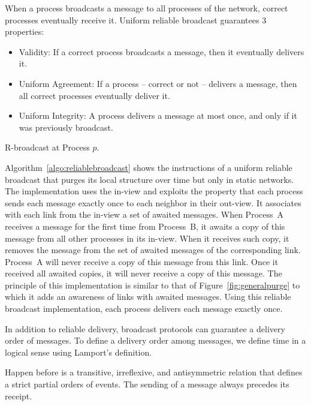 \begin{definition} 
  When a process broadcasts a message to all processes of the network, correct
  processes eventually receive it. Uniform reliable broadcast guarantees 3
  properties:
  \begin{itemize}
  \item Validity: If a correct process broadcasts a message, then it
    eventually delivers it.
  \item Uniform Agreement: If a process -- correct or not -- delivers a message,
    then all correct processes eventually deliver it.
  \item Uniform Integrity: A process delivers a message at most once, and only if
    it was previously broadcast.
  \end{itemize}
\end{definition}

\begin{algorithm}[h]
  
  \caption{\label{algo:reliablebroadcast}R-broadcast at Process $p$.}
\end{algorithm}

Algorithm~\ref{algo:reliablebroadcast} shows the instructions of a uniform
reliable broadcast that purges its local structure over time but only in static
networks. The implementation uses the in-view and exploits the property that
each process sends each message exactly once to each neighbor in their
out-view. It associates with each link from the in-view a set of awaited
messages. When Process~A receives a message for the first time from Process~B,
it awaits a copy of this message from all other processes in its in-view. When
it receives such copy, it removes the message from the set of awaited messages
of the corresponding link. Process~A will never receive a copy of this message
from this link. Once it received all awaited copies, it will never receive a
copy of this message. The principle of this implementation is similar to that of
Figure~\ref{fig:generalpurge} to which it adds an awareness of links with
awaited messages. Using this reliable broadcast implementation, each process
delivers each message exactly once.

In addition to reliable delivery, broadcast protocols can guarantee a delivery
order of messages. To define a delivery order among messages, we define time in
a logical sense using Lamport’s definition. 

\begin{definition}
  Happen before is a transitive, irreflexive, and antisymmetric relation that
  defines a strict partial orders of events. The sending of a message always
  precedes its receipt.
\end{definition}

